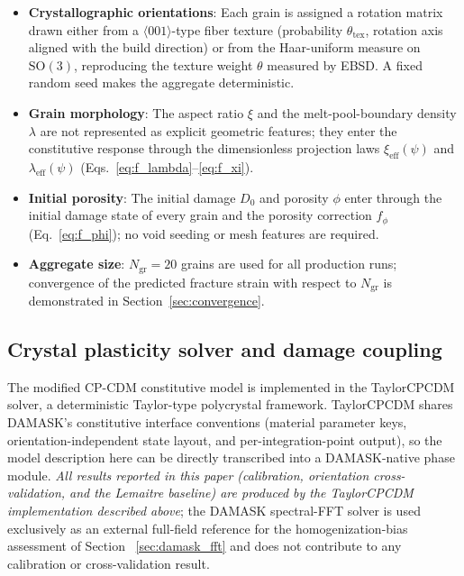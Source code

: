 \documentclass[twocolumn]{sagej}
\begin{document}
\begin{itemize}
    \item \textbf{Crystallographic orientations}: Each grain is assigned a rotation matrix drawn either from a $\langle001\rangle$-type fiber texture (probability $\theta_{\text{tex}}$, rotation axis aligned with the build direction) or from the Haar-uniform measure on $\mathrm{SO}(3)$, reproducing the texture weight $\theta$ measured by EBSD. A fixed random seed makes the aggregate deterministic.
    \item \textbf{Grain morphology}: The aspect ratio $\xi$ and the melt-pool-boundary density $\lambda$ are not represented as explicit geometric features; they enter the constitutive response through the dimensionless projection laws $\xi_{\text{eff}}(\psi)$ and $\lambda_{\text{eff}}(\psi)$ (Eqs.~\eqref{eq:f_lambda}--\eqref{eq:f_xi}).
    \item \textbf{Initial porosity}: The initial damage $D_0$ and porosity $\phi$ enter through the initial damage state of every grain and the porosity correction $f_\phi$ (Eq.~\eqref{eq:f_phi}); no void seeding or mesh features are required.
    \item \textbf{Aggregate size}: $N_{\text{gr}} = 20$ grains are used for all production runs; convergence of the predicted fracture strain with respect to $N_{\text{gr}}$ is demonstrated in Section~\ref{sec:convergence}.
\end{itemize}

\subsection{Crystal plasticity solver and damage coupling}

The modified CP-CDM constitutive model is implemented in the TaylorCPCDM solver, a deterministic Taylor-type polycrystal framework. TaylorCPCDM shares DAMASK's constitutive interface conventions (material parameter keys, orientation-independent state layout, and per-integration-point output), so the model description here can be directly transcribed into a DAMASK-native phase module. \emph{All results reported in this paper (calibration, orientation cross-validation, and the Lemaitre baseline) are produced by the TaylorCPCDM implementation described above}; the DAMASK spectral-FFT solver is used exclusively as an external full-field reference for the homogenization-bias assessment of Section~
\ref{sec:damask_fft} and does not contribute to any calibration or cross-validation result.
\end{document}
